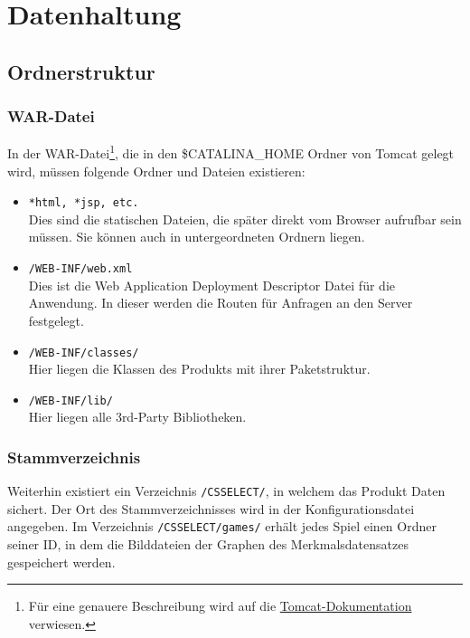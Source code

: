 \documentclass[a4paper]{scrreprt}
\begin{document}
    \chapter{Datenhaltung}

    \section{Ordnerstruktur}

    \subsection{WAR-Datei}
    In der WAR-Datei\footnote{Für eine genauere Beschreibung wird auf die \href{https://tomcat.apache.org/tomcat-7.0-doc/appdev/deployment.html\#Standard\_Directory\_Layout}{Tomcat-Dokumentation} verwiesen.}, die in den \$CATALINA\_HOME Ordner von Tomcat gelegt wird, müssen folgende Ordner und Dateien existieren:
    \begin{itemize}
        \item \texttt{*html, *jsp, etc.} \\Dies sind die statischen Dateien, die später direkt vom Browser aufrufbar sein müssen. Sie können auch in untergeordneten Ordnern liegen.
        \item \texttt{/WEB-INF/web.xml} \\Dies ist die Web Application Deployment Descriptor Datei für die Anwendung. In dieser werden die Routen für Anfragen an den Server festgelegt.
        \item \texttt{/WEB-INF/classes/} \\Hier liegen die Klassen des Produkts mit ihrer Paketstruktur.
        \item \texttt{/WEB-INF/lib/} \\Hier liegen alle 3rd-Party Bibliotheken.
    \end{itemize}
    \subsection{Stammverzeichnis}
    Weiterhin existiert ein Verzeichnis \texttt{/CSSELECT/}, in welchem das Produkt Daten sichert.
    Der Ort des Stammverzeichnisses wird in der Konfigurationsdatei angegeben.
    Im Verzeichnis \texttt{/CSSELECT/games/} erhält jedes Spiel einen Ordner seiner ID, in dem die Bilddateien der Graphen des Merkmalsdatensatzes gespeichert werden.
\end{document}
